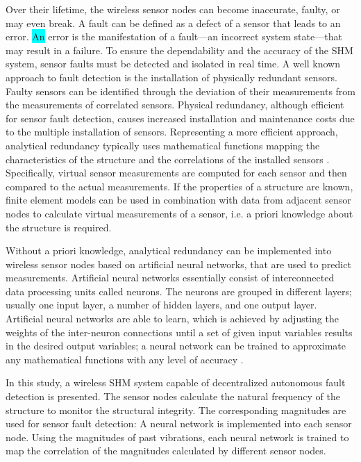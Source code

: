 \documentclass[12pt,a4paper]{scrartcl}
\begin{document}
Over their lifetime, the wireless sensor nodes can become inaccurate, faulty, or may even break.
A fault can be defined as a defect of a sensor that leads to an error. 
\colorbox{cyan}{An} error is the manifestation of a fault---an incorrect system state---that may result in a failure.
To ensure the dependability and the accuracy of the SHM system, sensor faults must be detected and isolated in real time. 
A well known approach to fault detection is the installation of physically redundant sensors.
Faulty sensors can be identified through the deviation of their measurements from the measurements of correlated sensors.
Physical redundancy, although efficient for sensor fault detection, causes increased installation and maintenance costs due to the multiple installation of sensors. 
Representing a more efficient approach, analytical redundancy typically uses mathematical functions mapping the characteristics of the structure and the correlations of the installed sensors \citep{Smarsly2014}. 
Specifically, virtual sensor measurements are computed for each sensor and then compared to the actual measurements. 
If the properties of a structure are known, finite element models can be used in combination with data from adjacent sensor nodes to calculate virtual measurements of a sensor, i.e. a priori knowledge about the structure is required.

Without a priori knowledge, analytical redundancy can be implemented into wireless sensor nodes based on artificial neural networks, that are used to predict measurements.
Artificial neural networks essentially consist of interconnected data processing units called neurons. 
The neurons are grouped in different layers; usually one input layer, a number of hidden layers, and one output layer.
Artificial neural networks are able to learn, which is achieved by adjusting the weights of the inter-neuron connections until a set of given input variables results in the desired output variables; a neural network can be trained to approximate any mathematical functions with any level of accuracy \citep{Li2011}.

In this study, a wireless SHM system capable of decentralized autonomous fault detection is presented.
The sensor nodes calculate the natural frequency of the structure to monitor the structural integrity.
The corresponding magnitudes are used for sensor fault detection:
A neural network is implemented into each sensor node. 
Using the magnitudes of past vibrations, each neural network is trained to map the correlation of the magnitudes calculated by different sensor nodes.
\end{document}
